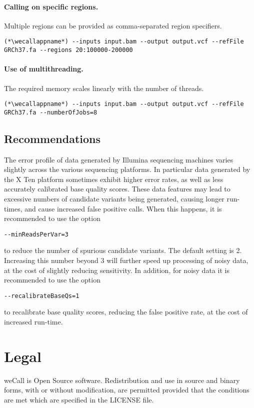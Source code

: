 \documentclass{article}
\newcommand{\wecallappname}{weCall}
\begin{document}
\paragraph{Calling on specific regions.}  Multiple regions can be provided as comma-separated region specifiers.
\begin{lstlisting}
(*\wecallappname*) --inputs input.bam --output output.vcf --refFile GRCh37.fa --regions 20:100000-200000
\end{lstlisting}
\paragraph{Use of multithreading.}  The required memory scales linearly with the number of threads.
\begin{lstlisting}
(*\wecallappname*) --inputs input.bam --output output.vcf --refFile GRCh37.fa --numberOfJobs=8
\end{lstlisting}

\subsection{Recommendations}

The error profile of data generated by Illumina sequencing machines varies slightly across the various sequencing platforms.
In particular data generated by the X Ten platform sometimes exhibit
higher error rates, as well as less accurately calibrated base quality scores.  These data features may lead to excessive numbers of candidate
variants being generated, causing longer run-times, and cause increased false positive calls.  When this happens, it is recommended to use the
option
\begin{lstlisting}
--minReadsPerVar=3
\end{lstlisting}
to reduce the number of spurious candidate variants.  The default setting is 2.  Increasing this number beyond 3 will further speed up processing
of noisy data, at the cost of slightly reducing sensitivity.  In addition, for noisy data it is recommended to use the option
\begin{lstlisting}
--recalibrateBaseQs=1
\end{lstlisting}
to recalibrate base quality scores, reducing the false positive rate, at the cost of increased run-time.



\section{Legal}

weCall is Open Source software. Redistribution and use in source and binary forms, with or without modification, are permitted provided that the conditions are met which are specified in the LICENSE file.
\end{document}
